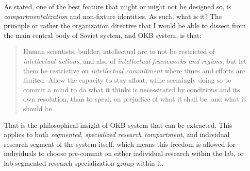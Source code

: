 \documentclass[10pt,a4paper]{article}
\begin{document}
As stated, one of the best feature that might or might not be designed so, is \textit{compartmentalization} and non-fixture identities. As such, what is it? The principle or rather the organization directive that I would be able to dissect from the main central body of Soviet system, and OKB system, is that: 
\begin{quote}
    Human scientists, builder, intellectual are to not be restricted of \textit{intellectual actions}, and also of \textit{intellectual frameworks and regions}, but let them be restrictive on \textit{intellectual commitment} where times and efforts are limited. Allow the capacity to stay afloat, while seemingly doing so to commit a mind to do what it thinks is necessitated by conditions and its own resolution, than to speak on prejudice of what it shall be, and what it should be. 
\end{quote}
That is the philosophical insight of OKB system that can be extracted. This applies to both \textit{segmented, specialized research compartment}, and individual research segment of the system itself, which means this freedom is allowed for individuals to choose pre-commit on either individual research within the lab, or lab-segmented research specialization group within it. 
\end{document}
